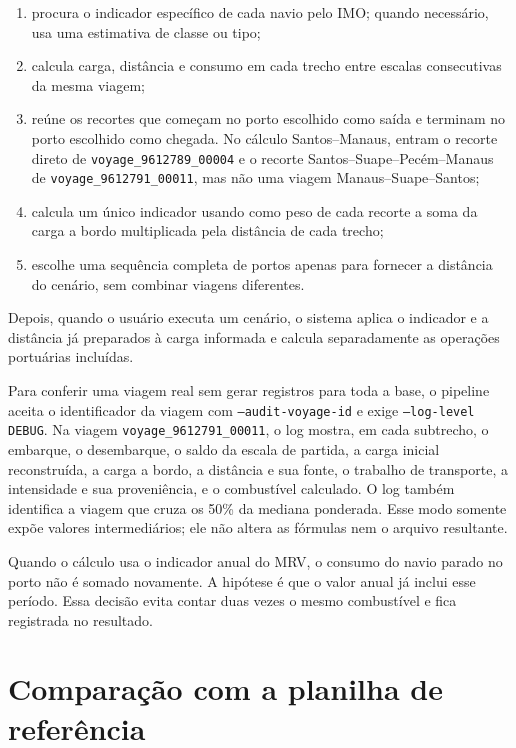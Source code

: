 \documentclass[12pt,a4paper]{report}
\begin{document}
\begin{enumerate}
  \item procura o indicador específico de cada navio pelo IMO; quando necessário, usa uma estimativa de classe ou tipo;
  \item calcula carga, distância e consumo em cada trecho entre escalas consecutivas da mesma viagem;
  \item reúne os recortes que começam no porto escolhido como saída e terminam no porto escolhido como chegada. No cálculo Santos--Manaus, entram o recorte direto de \texttt{voyage\_9612789\_00004} e o recorte Santos--Suape--Pecém--Manaus de \texttt{voyage\_9612791\_00011}, mas não uma viagem Manaus--Suape--Santos;
  \item calcula um único indicador usando como peso de cada recorte a soma da carga a bordo multiplicada pela distância de cada trecho;
  \item escolhe uma sequência completa de portos apenas para fornecer a distância do cenário, sem combinar viagens diferentes.
\end{enumerate}

Depois, quando o usuário executa um cenário, o sistema aplica o indicador e a distância já preparados à carga informada e calcula separadamente as operações portuárias incluídas.

Para conferir uma viagem real sem gerar registros para toda a base, o pipeline aceita o identificador da viagem com \texttt{--audit-voyage-id} e exige \texttt{--log-level DEBUG}. Na viagem \texttt{voyage\_9612791\_00011}, o log mostra, em cada subtrecho, o embarque, o desembarque, o saldo da escala de partida, a carga inicial reconstruída, a carga a bordo, a distância e sua fonte, o trabalho de transporte, a intensidade e sua proveniência, e o combustível calculado. O log também identifica a viagem que cruza os 50\% da mediana ponderada. Esse modo somente expõe valores intermediários; ele não altera as fórmulas nem o arquivo resultante.

Quando o cálculo usa o indicador anual do MRV, o consumo do navio parado no porto não é somado novamente. A hipótese é que o valor anual já inclui esse período. Essa decisão evita contar duas vezes o mesmo combustível e fica registrada no resultado.

\section{Comparação com a planilha de referência}
\end{document}
